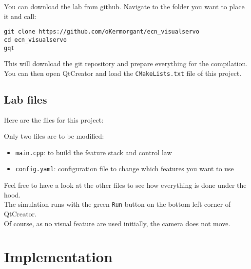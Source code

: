 \documentclass{ecnreport}
\begin{document}
You can download the lab from github. Navigate to the folder you want to place it and call:
\begin{center}\bashstyle
\begin{lstlisting}
git clone https://github.com/oKermorgant/ecn_visualservo
cd ecn_visualservo
gqt
\end{lstlisting}
\end{center}

This will download the git repository and prepare everything for the compilation.\\
You can then open QtCreator and load the \texttt{CMakeLists.txt} file of this project.

\subsection{Lab files}

Here are the files for this project:

\begin{center}
\begin{minipage}{.4\linewidth}
\end{minipage}
\begin{minipage}{.55\linewidth}
 Only two files are to be modified:
 \begin{itemize}
  \item \texttt{main.cpp}: to build the feature stack and control law
  \item \texttt{config.yaml}: configuration file to change which features you want to use
 \end{itemize}
\end{minipage}
\end{center}

Feel free to have a look at the other files to see how everything is done under the hood.\\

The simulation runs with the green \texttt{Run} button on the bottom left corner of QtCreator.\\
Of course, as no visual feature are used initially, the camera does not move.

\section{Implementation}
\end{document}
